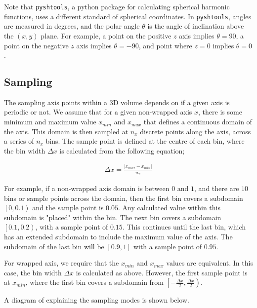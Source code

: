 \documentclass[a4, 12pt]{article}
\begin{document}

Note that \texttt{pyshtools}, a python package for calculating spherical harmonic functions, uses a different standard of spherical coordinates. In \texttt{pyshtools}, angles are measured in degrees, and the polar angle $\theta$ is the angle of inclination above the $(x,y)$ plane. For example, a point on the positive $z$ axis implies $\theta=90$, a point on the negative $z$ axis implies $\theta=-90$, and point where $z=0$ implies $\theta=0$.



\subsection{Sampling}

The sampling axis points within a 3D volume depends on if a given axis is periodic or not. We assume that for a given non-wrapped axis $x$, there is some minimum and maximum value $x_{min}$ and $x_{max}$ that defines a continuous domain of the axis. This domain is then sampled at $n_x$ discrete points along the axis, across a series of $n_x$ bins. The sample point is defined at the centre of each bin, where the bin width $\Delta x$ is calculated from the following equation;

\begin{align*}
	\Delta x = \frac{|x_{max} - x_{min}|}{n_x}
\end{align*}

For example, if a non-wrapped axis domain is between $0$ and $1$, and there are $10$ bins or sample points across the domain, then the first bin covers a subdomain $\left[0, 0.1\right)$ and the sample point is $0.05$. Any calculated value within this subdomain is "placed" within the bin. The next bin covers a subdomain $\left[0.1, 0.2\right)$, with a sample point of $0.15$. This continues until the last bin, which has an extended subdomain to include the maximum value of the axis. The subdomain of the last bin will be $[0.9, 1]$ with a sample point of $0.95$.

For wrapped axis, we require that the $x_{min}$ and $x_{max}$ values are equivalent. In this case, the bin width $\Delta x$ is calculated as above. However, the first sample point is at $x_{min}$, where the first bin covers a subdomain from $\left[-\frac{\Delta x}{2}, \frac{\Delta x}{2}\right)$.

A diagram of explaining the sampling modes is shown below.
\end{document}
